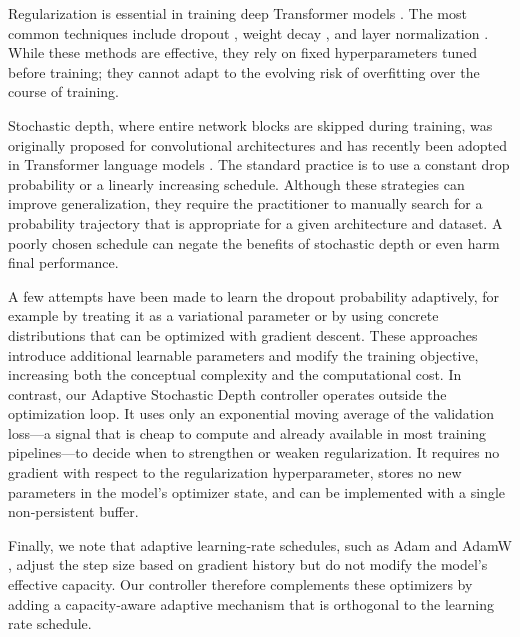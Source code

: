 \documentclass{article} %
\begin{document}
Regularization is essential in training deep Transformer models \citep{vaswani2017attention}. The most common techniques include dropout \citep{goodfellow2016deep}, weight decay \citep{loshchilov2017adamw}, and layer normalization \citep{ba2016layer}. While these methods are effective, they rely on fixed hyperparameters tuned before training; they cannot adapt to the evolving risk of overfitting over the course of training.

Stochastic depth, where entire network blocks are skipped during training, was originally proposed for convolutional architectures and has recently been adopted in Transformer language models \citep{karpathy2023nanogpt}. The standard practice is to use a constant drop probability or a linearly increasing schedule. Although these strategies can improve generalization, they require the practitioner to manually search for a probability trajectory that is appropriate for a given architecture and dataset. A poorly chosen schedule can negate the benefits of stochastic depth or even harm final performance.

A few attempts have been made to learn the dropout probability adaptively, for example by treating it as a variational parameter or by using concrete distributions that can be optimized with gradient descent. These approaches introduce additional learnable parameters and modify the training objective, increasing both the conceptual complexity and the computational cost. In contrast, our Adaptive Stochastic Depth controller operates outside the optimization loop. It uses only an exponential moving average of the validation loss—a signal that is cheap to compute and already available in most training pipelines—to decide when to strengthen or weaken regularization. It requires no gradient with respect to the regularization hyperparameter, stores no new parameters in the model’s optimizer state, and can be implemented with a single non‑persistent buffer.

Finally, we note that adaptive learning‑rate schedules, such as Adam \citep{kingma2014adam} and AdamW \citep{loshchilov2017adamw}, adjust the step size based on gradient history but do not modify the model’s effective capacity. Our controller therefore complements these optimizers by adding a capacity‑aware adaptive mechanism that is orthogonal to the learning rate schedule.
\end{document}
